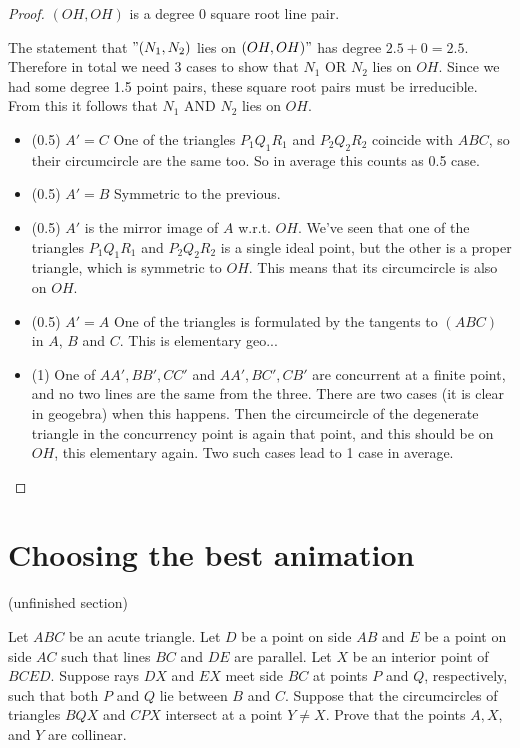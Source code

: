 \documentclass[a4paper]{article}
\begin{document}
\begin{proof}
$(OH, OH)$ is a degree 0 square root line pair.

The statement that $"(N_1,N_2)$ lies on $(OH, OH)"$ has degree $2.5+0=2.5$. Therefore in total we need $3$ cases to show that $N_1$ OR $N_2$ lies on $OH$. Since we had some degree 1.5 point pairs, these square root pairs must be irreducible. From this it follows that $N_1$ AND $N_2$ lies on $OH$.

\begin{itemize}
    \item (0.5) $A'=C$ One of the triangles $P_1Q_1R_1$ and $P_2Q_2R_2$ coincide with $ABC$, so their circumcircle are the same too. So in average this counts as 0.5 case.
    \item (0.5) $A'=B$ Symmetric to the previous.
    \item (0.5)  $A'$ is the mirror image of $A$ w.r.t. $OH$. We've seen that one of the triangles $P_1Q_1R_1$ and $P_2Q_2R_2$ is a single ideal point, but the other is a proper triangle, which is symmetric to $OH$. This means that its circumcircle is also on $OH$.
    \item (0.5) $A'=A$ One of the triangles is formulated by the tangents to $(ABC)$ in $A$, $B$ and $C$. This is elementary geo...
    \item (1) One of $AA',BB',CC'$ and $AA',BC',CB'$ are concurrent at a finite point, and no two lines are the same from the three. There are two cases (it is clear in geogebra) when this happens. Then the circumcircle of the degenerate triangle in the concurrency point is again that point, and this should be on $OH$, this elementary again. Two such cases lead to 1 case in average.
\end{itemize}
    
    
\end{proof}

\section{Choosing the best animation}
(unfinished section)
\begin{exercise}[APMO 2024 1]
    Let $ABC$ be an acute triangle. Let $D$ be a point on side $AB$ and $E$ be a point on side $AC$ such that lines $BC$ and $DE$ are parallel. Let $X$ be an interior point of $BCED$. Suppose rays $DX$ and $EX$ meet side $BC$ at points $P$ and $Q$, respectively, such that both $P$ and $Q$ lie between $B$ and $C$. Suppose that the circumcircles of triangles $BQX$ and $CPX$ intersect at a point $Y \neq X$. Prove that the points $A, X$, and $Y$ are collinear.
\end{exercise}
\end{document}
